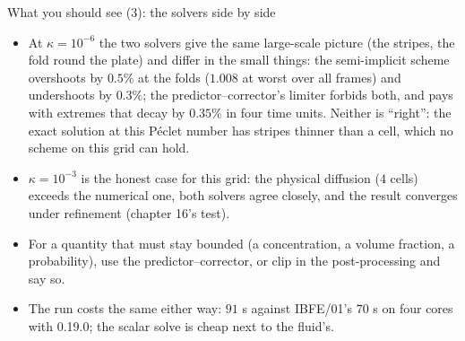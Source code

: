 \documentclass[aspectratio=169,11pt]{beamer}
\begin{document}
\begin{frame}{What you should see (3): the solvers side by side}
\label{fr:solvers2}
\footnotesize
\begin{itemize}
  \item At $\kappa = 10^{-6}$ the two solvers give the same large-scale picture (the stripes, the fold round the plate) and differ in the small things: the semi-implicit scheme overshoots by $0.5\%$ at the folds ($1.008$ at worst over all frames) and undershoots by $0.3\%$; the predictor--corrector's limiter forbids both, and pays with extremes that decay by $0.35\%$ in four time units. Neither is ``right'': the exact solution at this P\'eclet number has stripes thinner than a cell, which no scheme on this grid can hold.
  \item $\kappa = 10^{-3}$ is the honest case for this grid: the physical diffusion ($4$ cells) exceeds the numerical one, both solvers agree closely, and the result converges under refinement (chapter 16's test).
  \item For a quantity that must stay bounded (a concentration, a volume fraction, a probability), use the predictor--corrector, or clip in the post-processing and say so.
  \item The run costs the same either way: $91$ s against IBFE/01's $70$ s on four cores with 0.19.0; the scalar solve is cheap next to the fluid's.
\end{itemize}
\end{frame}
\end{document}

